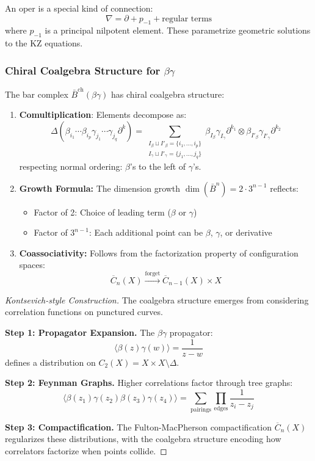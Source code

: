 \begin{remark}
An oper is a special kind of connection:
\[
\nabla = \partial + p_{-1} + \text{regular terms}
\]
where $p_{-1}$ is a principal nilpotent element. These parametrize geometric solutions 
to the KZ equations.
\end{remark}

\subsubsection{Chiral Coalgebra Structure for $\beta\gamma$}

\begin{theorem}\label{thm:bg-bar-coalg}
The bar complex $\bar{B}^{\text{ch}}(\beta\gamma)$ has chiral coalgebra structure:
\begin{enumerate}
\item \textbf{Comultiplication}: Elements decompose as:
\[
\Delta(\beta_{i_1} \cdots \beta_{i_p} \gamma_{j_1} \cdots \gamma_{j_q} \partial^k) = 
\sum_{\substack{I_\beta \sqcup I'_\beta = \{i_1,\ldots,i_p\} \\ I_\gamma \sqcup I'_\gamma = \{j_1,\ldots,j_q\}}} 
\beta_{I_\beta}\gamma_{I_\gamma}\partial^{k_1} \otimes \beta_{I'_\beta}\gamma_{I'_\gamma}\partial^{k_2}
\]
respecting normal ordering: $\beta$'s to the left of $\gamma$'s.

\item \textbf{Growth Formula:} The dimension growth $\dim(\bar{B}^n) = 2 \cdot 3^{n-1}$ reflects:
\begin{itemize}
\item Factor of 2: Choice of leading term ($\beta$ or $\gamma$)
\item Factor of $3^{n-1}$: Each additional point can be $\beta$, $\gamma$, or derivative
\end{itemize}

\item \textbf{Coassociativity:} Follows from the factorization property of configuration spaces:
\[
\overline{C}_{n}(X) \xrightarrow{\text{forget}} \overline{C}_{n-1}(X) \times X
\]
\end{enumerate}
\end{theorem}

\begin{proof}[Kontsevich-style Construction]
The coalgebra structure emerges from considering correlation functions on punctured curves.

\textbf{Step 1: Propagator Expansion.} The $\beta\gamma$ propagator:
\[
\langle \beta(z)\gamma(w) \rangle = \frac{1}{z-w}
\]
defines a distribution on $C_2(X) = X \times X \setminus \Delta$.

\textbf{Step 2: Feynman Graphs.} Higher correlations factor through tree graphs:
\[
\langle \beta(z_1)\gamma(z_2)\beta(z_3)\gamma(z_4) \rangle = 
\sum_{\text{pairings}} \prod_{\text{edges}} \frac{1}{z_i - z_j}
\]

\textbf{Step 3: Compactification.} The Fulton-MacPherson compactification $\overline{C}_n(X)$ 
regularizes these distributions, with the coalgebra structure encoding how correlators 
factorize when points collide.
\end{proof}


